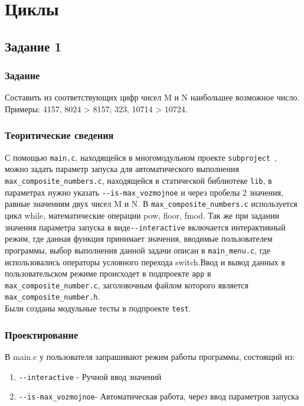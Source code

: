 \documentclass[12pt,a4paper]{report}
\begin{document}
\chapter{Циклы}
\section{Задание 1}
\subsection{Задание}
Составить из соответствующих цифр чисел M и N наибольшее возможное число.
Примеры: 4157, 8024 > 8157; 323, 10714 > 10724.
\subsection{Теоритические сведения}
С помощью \verb+main.c+, находящейся в многомодульном проекте \verb+subproject +, можно задать параметр запуска для автоматического выполнения\\ 
\verb+max_composite_numbers.c+, находящейся в статической библиотеке \verb+lib+, в параметрах нужно указать 
\verb+--is-max_vozmojnoe+ и через пробелы 2 значения, равные значениям двух чисел M и N. В \verb+max_composite_numbers.c+ используется цикл while, математические операции pow, floor, fmod. Так же при задании значения параметра запуска в виде\verb+--interactive+ включается интерактивный режим, где данная функция принимает значения, вводимые пользователем программы, выбор выполнения данной задачи описан в \verb+main_menu.c+, где использовались операторы условного перехода switch.Ввод и вывод данных в пользовательском режиме происходет в подпроекте \verb+app+ в 
\verb+max_composite_number.c+, заголовочным файлом которого является \verb+max_composite_number.h+. \\ 
Были созданы модульные тесты в подпроекте \verb+test+. 
\subsection{Проектирование}
В main.c у пользователя запрашивают режим работы программы, состоящий из:
\begin{enumerate}
\item \verb+--interactive+ - Ручной ввод значений
\item \verb+--is-max_vozmojnoe+- Автоматическая работа, через ввод параметров запуска
\end{enumerate}
\end{document}
